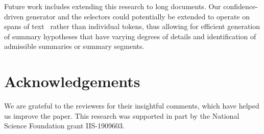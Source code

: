 \documentclass[11pt]{article}
\begin{document}
Future work includes extending this research to long documents.
Our confidence-driven generator and the selectors could potentially be extended to operate on spans of text~\cite{joshi-etal-2020-spanbert} rather than individual tokens,
thus allowing for efficient generation of summary hypotheses that have varying degrees of details and identification of admissible summaries or summary segments.


\section*{Acknowledgements}
We are grateful to the reviewers for their insightful comments, which have helped us improve the paper.
This research was supported in part by the National Science Foundation grant IIS-1909603.




\end{document}
